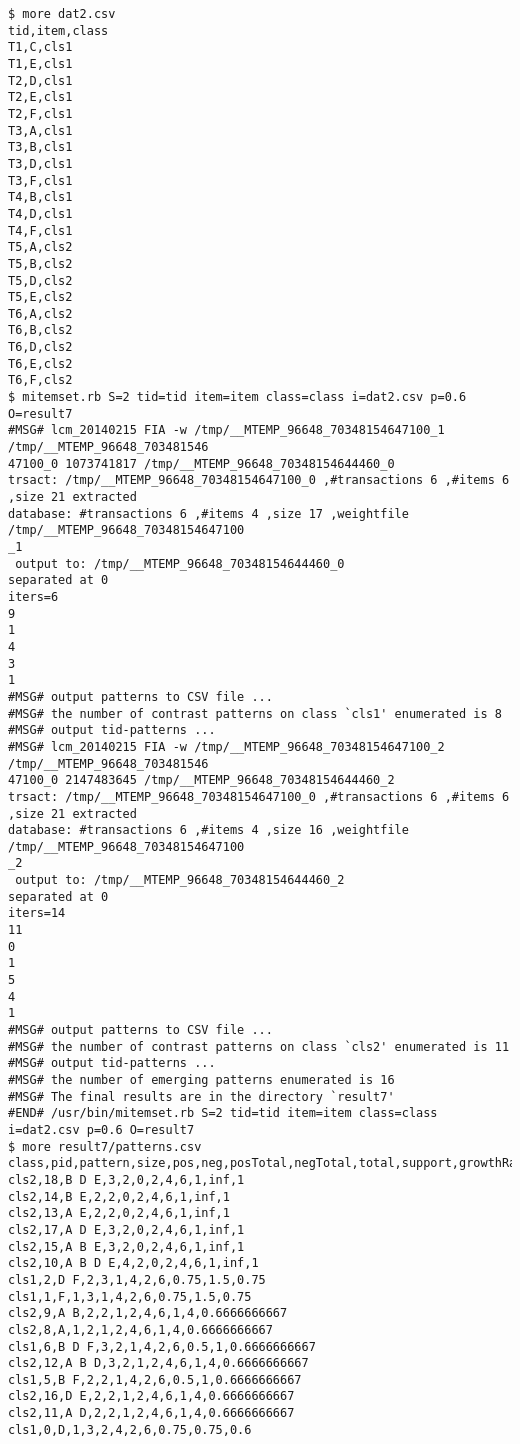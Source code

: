 \begin{Verbatim}[baselinestretch=0.7,frame=single]
$ more dat2.csv
tid,item,class
T1,C,cls1
T1,E,cls1
T2,D,cls1
T2,E,cls1
T2,F,cls1
T3,A,cls1
T3,B,cls1
T3,D,cls1
T3,F,cls1
T4,B,cls1
T4,D,cls1
T4,F,cls1
T5,A,cls2
T5,B,cls2
T5,D,cls2
T5,E,cls2
T6,A,cls2
T6,B,cls2
T6,D,cls2
T6,E,cls2
T6,F,cls2
$ mitemset.rb S=2 tid=tid item=item class=class i=dat2.csv p=0.6 O=result7
#MSG# lcm_20140215 FIA -w /tmp/__MTEMP_96648_70348154647100_1 /tmp/__MTEMP_96648_703481546
47100_0 1073741817 /tmp/__MTEMP_96648_70348154644460_0
trsact: /tmp/__MTEMP_96648_70348154647100_0 ,#transactions 6 ,#items 6 ,size 21 extracted 
database: #transactions 6 ,#items 4 ,size 17 ,weightfile /tmp/__MTEMP_96648_70348154647100
_1
 output to: /tmp/__MTEMP_96648_70348154644460_0
separated at 0
iters=6
9
1
4
3
1
#MSG# output patterns to CSV file ...
#MSG# the number of contrast patterns on class `cls1' enumerated is 8
#MSG# output tid-patterns ...
#MSG# lcm_20140215 FIA -w /tmp/__MTEMP_96648_70348154647100_2 /tmp/__MTEMP_96648_703481546
47100_0 2147483645 /tmp/__MTEMP_96648_70348154644460_2
trsact: /tmp/__MTEMP_96648_70348154647100_0 ,#transactions 6 ,#items 6 ,size 21 extracted 
database: #transactions 6 ,#items 4 ,size 16 ,weightfile /tmp/__MTEMP_96648_70348154647100
_2
 output to: /tmp/__MTEMP_96648_70348154644460_2
separated at 0
iters=14
11
0
1
5
4
1
#MSG# output patterns to CSV file ...
#MSG# the number of contrast patterns on class `cls2' enumerated is 11
#MSG# output tid-patterns ...
#MSG# the number of emerging patterns enumerated is 16
#MSG# The final results are in the directory `result7'
#END# /usr/bin/mitemset.rb S=2 tid=tid item=item class=class i=dat2.csv p=0.6 O=result7
$ more result7/patterns.csv
class,pid,pattern,size,pos,neg,posTotal,negTotal,total,support,growthRate,postProb
cls2,18,B D E,3,2,0,2,4,6,1,inf,1
cls2,14,B E,2,2,0,2,4,6,1,inf,1
cls2,13,A E,2,2,0,2,4,6,1,inf,1
cls2,17,A D E,3,2,0,2,4,6,1,inf,1
cls2,15,A B E,3,2,0,2,4,6,1,inf,1
cls2,10,A B D E,4,2,0,2,4,6,1,inf,1
cls1,2,D F,2,3,1,4,2,6,0.75,1.5,0.75
cls1,1,F,1,3,1,4,2,6,0.75,1.5,0.75
cls2,9,A B,2,2,1,2,4,6,1,4,0.6666666667
cls2,8,A,1,2,1,2,4,6,1,4,0.6666666667
cls1,6,B D F,3,2,1,4,2,6,0.5,1,0.6666666667
cls2,12,A B D,3,2,1,2,4,6,1,4,0.6666666667
cls1,5,B F,2,2,1,4,2,6,0.5,1,0.6666666667
cls2,16,D E,2,2,1,2,4,6,1,4,0.6666666667
cls2,11,A D,2,2,1,2,4,6,1,4,0.6666666667
cls1,0,D,1,3,2,4,2,6,0.75,0.75,0.6
\end{Verbatim}
